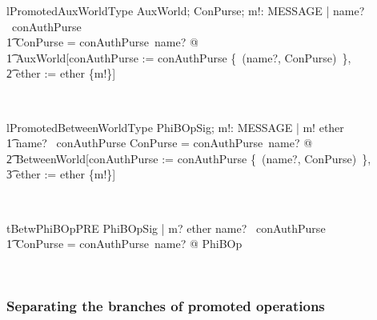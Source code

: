 \begin{LNewLemma}
\begin{theorem}{lPromotedAuxWorldType}
   \forall AuxWorld; ConPurse; m!: MESSAGE | name? \in \dom~conAuthPurse \\
        \t1 \land \theta ConPurse = conAuthPurse~name? @ \\
            \t1 AuxWorld[conAuthPurse := conAuthPurse \oplus \{~(name?, \theta ConPurse)~\}, \\
                \t2 ether := ether \cup \{m!\}]
\end{theorem}~\end{LNewLemma}


\begin{LNewLemma}
\begin{theorem}{lPromotedBetweenWorldType}
   \forall PhiBOpSig; m!: MESSAGE | m! \in ether \land \\
        \t1 name? \in \dom~conAuthPurse \land \theta ConPurse = conAuthPurse~name? @ \\
            \t2 BetweenWorld[conAuthPurse := conAuthPurse \oplus \{~(name?, \theta ConPurse)~\}, \\
                \t3 ether := ether \cup \{m!\}]
\end{theorem}~\end{LNewLemma}

\begin{LNewThm}
\begin{theorem}{tBetwPhiBOpPRE}
   \forall PhiBOpSig | m? \in ether \land name? \in \dom~conAuthPurse \\
        \t1 \land \theta ConPurse = conAuthPurse~name? @ \pre PhiBOp
\end{theorem}~\end{LNewThm}

\subsubsection{Separating the branches of promoted operations}

